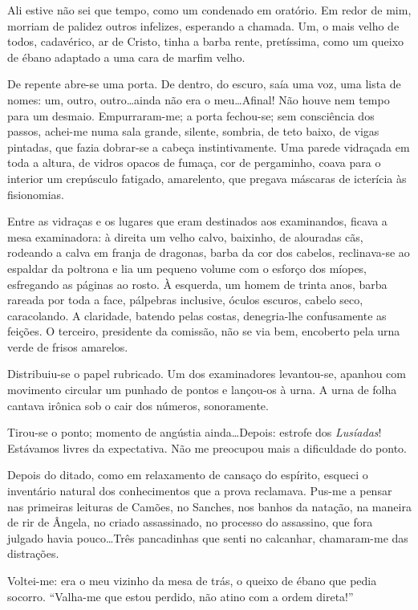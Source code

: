 Ali estive não sei que tempo, como um condenado em
oratório. Em redor de mim, morriam de palidez outros infelizes,
esperando a chamada. Um, o mais velho de todos, cadavérico, ar de
Cristo, tinha a barba rente, pretíssima, como um queixo de ébano
adaptado a uma cara de marfim velho. 

De repente abre{}-se uma porta. De
dentro, do escuro, saía uma voz, uma lista de nomes: um, outro,
outro\ldots ainda não era o meu\ldots Afinal! Não houve nem tempo para um
desmaio. Empurraram{}-me; a porta fechou{}-se; sem consciência dos
passos, achei{}-me numa sala grande, silente, sombria, de teto baixo,
de vigas pintadas, que fazia dobrar{}-se a cabeça instintivamente. Uma
parede vidraçada em toda a altura, de vidros opacos de fumaça, cor de
pergaminho, coava para o interior um crepúsculo fatigado, amarelento,
que pregava máscaras de icterícia às fisionomias. 

Entre as vidraças e
os lugares que eram destinados aos examinandos, ficava a mesa
examinadora: à direita um velho calvo, baixinho, de alouradas cãs,
rodeando a calva em franja de dragonas, barba da cor dos cabelos,
reclinava{}-se ao espaldar da poltrona e lia um pequeno volume com o
esforço dos míopes, esfregando as páginas ao rosto. À esquerda, um
homem de trinta anos, barba rareada por toda a face, pálpebras
inclusive, óculos escuros, cabelo seco, caracolando. A claridade,
batendo pelas costas, denegria{}-lhe confusamente as feições. O
terceiro, presidente da comissão, não se via bem, encoberto pela urna
verde de frisos amarelos. 

Distribuiu{}-se o papel rubricado. Um dos
examinadores levantou{}-se, apanhou com movimento circular um punhado
de pontos e lançou{}-os à urna. A urna de folha cantava irônica sob o
cair dos números, sonoramente. 

Tirou{}-se o ponto; momento de angústia
ainda\ldots Depois: estrofe dos \textit{Lusíadas}! Estávamos livres da expectativa.
Não me preocupou mais a dificuldade do ponto. 


Depois do ditado, como em
relaxamento de cansaço do espírito, esqueci o inventário natural dos
conhecimentos que a prova reclamava. Pus{}-me a pensar nas primeiras
leituras de Camões, no Sanches, nos banhos da natação, na maneira de
rir de Ângela, no criado assassinado, no processo do assassino, que
fora julgado havia pouco\ldots Três pancadinhas que senti no calcanhar,
chamaram{}-me das distrações. 


Voltei{}-me: era o meu vizinho da mesa de
trás, o queixo de ébano que pedia socorro. ``Valha{}-me que estou
perdido, não atino com a ordem direta!'' 

